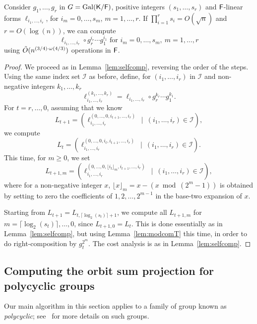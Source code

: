 \begin{lemma}
  \label{lem:transmodcomp}
  Consider $g_1, \ldots, g_r$ in $G=\mathrm{Gal}({\mathsf{K}}/{\mathsf{F}})$, positive
  integers $(s_1, \ldots, s_r)$ and ${\mathsf{F}}$-linear forms $\ell_{i_1,
    \dots, i_r}$, for $i_m=0,\dots,s_m$, $m=1,\dots,r$. If $\prod_{i =
    1}^r s_i = O(\sqrt{n})$ and $r = O(\log(n))$, we can compute
  $$\ell_{i_1, \dots, i_r} \circ g_r^{i_r}\cdots g_1^{i_1}
  \text{~for~} i_m=0,\dots,s_m,\ m=1,\dots,r
  $$  using $\tilde{O}(n^{(3/4)\cdot \omega(4/3)})$ operations in ${\mathsf{F}}$.
\end{lemma} 
\begin{proof}
  We proceed as in Lemma~\ref{lem:selfcomp}, reversing the order of
  the steps. Using the same index set $\mathcal I$ as before, define,
  for $(i_1,\dots,i_r)$ in $\mathcal I$ and non-negative integers
  $k_1,\dots,k_r$
  $$\ell_{i_1,\dots,i_r}^{(k_1,\dots,k_r)} =\ell_{i_1,\dots,i_r} \circ g_r^{k_r}\cdots g_1^{k_1}.$$
  For $t=r,\dots,0$, assuming that
  we know 
  $$L_{t+1} = (\ell_{i_1, \dots,i_r}^{(0, \dots, 0,i_{t+1},\dots,i_r)} \ \mid
  \ (i_1,\dots,i_r)\in \mathcal I),$$ we compute 
  $$L_{t}=(\ell_{i_1, \dots,i_r}^{(0, \dots, 0,i_{t},i_{t+1},\dots,i_r)}
  \ \mid \ (i_1,\dots,i_r)\in \mathcal I).$$
  This time, for $m \ge 0$, we set
  $$L_{t+1,m} = (\ell_{i_1, \dots,i_r}^{(0, \dots, 0,\lfloor i_{t}
    \rfloor_m,i_{t+1},\dots,i_r)} \ \mid \ (i_1,\dots,i_r)\in \mathcal
  I),$$ where for a non-negative integer $x$, $\lfloor x \rfloor_m = x
  - (x \bmod (2^m-1))$ is obtained by setting to zero the coefficients
  of $1,2,\dots,2^{m-1}$ in the base-two expansion of $x$.

  Starting from $L_{t+1} = L_{t, \lceil \log_2(s_t) \rceil +1}$, we
  compute all $L_{t+1,m}$ for $m= \lceil \log_2(s_t) \rceil,\dots,0$,
  since $L_{t+1,0} = L_{t}$. This is done essentially as in
  Lemma~\ref{lem:selfcomp}, but using Lemma~\ref{lem:modcomT} this
  time, in order to do right-composition by $g_t^{2^m}$.
  The cost analysis is as in Lemma~\ref{lem:selfcomp}.
\end{proof}


\subsection{Computing the orbit sum projection for polycyclic groups}
\label{ssec:proj_abelian}

Our main algorithm in this section applies to a family of group known
as {\em polycyclic}; see~\cite[Chapter 8]{HoEiOb05} for more details
on such groups.

